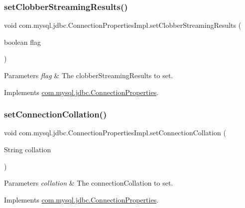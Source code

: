 \subsubsection{\texorpdfstring{set\+Clobber\+Streaming\+Results()}{setClobberStreamingResults()}}
{\footnotesize\ttfamily void com.\+mysql.\+jdbc.\+Connection\+Properties\+Impl.\+set\+Clobber\+Streaming\+Results (\begin{DoxyParamCaption}\item[{boolean}]{flag }\end{DoxyParamCaption})}


\begin{DoxyParams}{Parameters}
{\em flag} & The clobber\+Streaming\+Results to set. \\
\hline
\end{DoxyParams}


Implements \mbox{\hyperlink{interfacecom_1_1mysql_1_1jdbc_1_1_connection_properties_a3bb976fbcde1b60e4dae84b49320de5f}{com.\+mysql.\+jdbc.\+Connection\+Properties}}.

\mbox{\label{classcom_1_1mysql_1_1jdbc_1_1_connection_properties_impl_a2f3f37ab6830d458a0e9ce843ad48c3d}} 
\subsubsection{\texorpdfstring{set\+Connection\+Collation()}{setConnectionCollation()}}
{\footnotesize\ttfamily void com.\+mysql.\+jdbc.\+Connection\+Properties\+Impl.\+set\+Connection\+Collation (\begin{DoxyParamCaption}\item[{String}]{collation }\end{DoxyParamCaption})}


\begin{DoxyParams}{Parameters}
{\em collation} & The connection\+Collation to set. \\
\hline
\end{DoxyParams}


Implements \mbox{\hyperlink{interfacecom_1_1mysql_1_1jdbc_1_1_connection_properties_a69729667beed7cc9989d0b736d2cc28d}{com.\+mysql.\+jdbc.\+Connection\+Properties}}.

